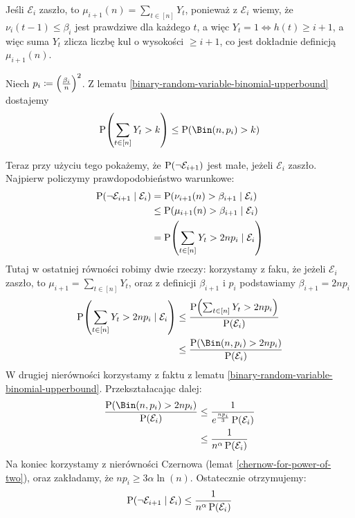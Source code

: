 Jeśli \(\mathcal{E}_i\) zaszło, to \(\mu_{i+1}(n) = \sum_{t \in [n]} Y_t\), ponieważ z \(\mathcal{E}_i\) wiemy, że \(\nu_i(t - 1) \leq \beta_i\) jest prawdziwe dla każdego \(t\), a więc \(Y_t = 1 \iff h(t) \geq i + 1\), a więc suma \(Y_t\) zlicza liczbę kul o wysokości \(\geq i + 1\), co jest dokładnie definicją \(\mu_{i+1}(n)\).

Niech \(p_i \coloneq \left(\frac{\beta_i}{n}\right)^2\). Z lematu \ref{binary-random-variable-binomial-upperbound} dostajemy
\[
	\prob\pars{\sum_{t \in [n]} Y_t > k} \leq \prob(\Bin(n, p_i) > k)
\]

Teraz przy użyciu tego pokażemy, że \( \prob\pars{\neg\mathcal{E}_{i+1}} \) jest małe, jeżeli \( \mathcal{E}_i \) zaszło.
Najpierw policzymy prawdopodobieństwo warunkowe:
\begin{align*}
	\prob\pars{\neg\mathcal{E}_{i+1} \mid \mathcal{E}_i} & = \prob\pars{\nu_{i+1}\pars{n} > \beta_{i+1} \mid \mathcal{E}_i}    \\
	                                                     & \leq \prob\pars{\mu_{i+1}\pars{n} > \beta_{i+1} \mid \mathcal{E}_i} \\
	                                                     & = \prob\pars{\sum_{t \in [n]} Y_t > 2np_i \mid \mathcal{E}_i}       \\
\end{align*}
Tutaj w ostatniej równości robimy dwie rzeczy: korzystamy z faku, że jeżeli \( \mathcal{E}_i \) zaszło, to \(\mu_{i+1} = \sum_{t \in [n]} Y_t \), oraz
z definicji \( \beta_{i+1} \) i \( p_i \) podstawiamy \( \beta_{i+1} = 2np_i \)
\begin{align*}
	\prob\pars{\sum_{t \in [n]} Y_t > 2np_i \mid \mathcal{E}_i} & \leq \frac{\prob\pars{\sum_{t \in [n]} Y_t > 2np_i}}{\prob\pars{\mathcal{E}_i}} \\
	                                                            & \leq \frac{\prob\pars{\Bin(n,p_i) > 2np_i}}{\prob\pars{\mathcal{E}_i}}          \\
\end{align*}
W drugiej nierówności korzystamy z faktu z lematu \ref{binary-random-variable-binomial-upperbound}. Przekształacając dalej:
\begin{align*}
	\frac{\prob\pars{\Bin(n,p_i) > 2np_i}}{\prob\pars{\mathcal{E}_i}} & \leq \frac{1}{e^{\frac{np_i}{3}}\prob\pars{\mathcal{E}_i}} \\
	                                                                  & \leq \frac{1}{n^{\alpha}\prob\pars{\mathcal{E}_i}}
\end{align*}
Na koniec korzystamy z nierówności Czernowa (lemat \ref{chernow-for-power-of-two}), oraz zakładamy, że \( np_i \geq 3\alpha\ln(n) \).
Ostatecznie otrzymujemy:
\[
	\prob\pars{\neg\mathcal{E}_{i+1} \mid \mathcal{E}_i} \leq \frac{1}{n^{\alpha}\prob\pars{\mathcal{E}_i}}
\]

